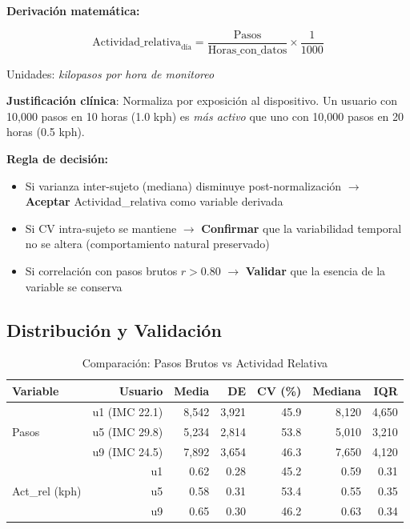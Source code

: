 \documentclass[12pt,letterpaper,twoside]{report}
\begin{document}
\begin{estadisticobox}
\textbf{Derivación matemática:}

\begin{equation}
\text{Actividad\_relativa}_{\text{día}} = \frac{\text{Pasos}}{\text{Horas\_con\_datos}} \times \frac{1}{1000}
\end{equation}

Unidades: \textit{kilopasos por hora de monitoreo}

\textbf{Justificación clínica}: Normaliza por exposición al dispositivo. Un usuario con 10,000 pasos en 10 horas (1.0 kph) es \textit{más activo} que uno con 10,000 pasos en 20 horas (0.5 kph).
\end{estadisticobox}

\begin{reglabox}
\textbf{Regla de decisión:}

\begin{itemize}[noitemsep]
    \item Si varianza inter-sujeto (mediana) disminuye post-normalización $\to$ \textbf{Aceptar} Actividad\_relativa como variable derivada
    \item Si CV intra-sujeto se mantiene $\to$ \textbf{Confirmar} que la variabilidad temporal no se altera (comportamiento natural preservado)
    \item Si correlación con pasos brutos $r > 0.80$ $\to$ \textbf{Validar} que la esencia de la variable se conserva
\end{itemize}
\end{reglabox}

\subsection{Distribución y Validación}

\begin{table}[H]
\centering
\caption{Comparación: Pasos Brutos vs Actividad Relativa}
\label{tab:activity_comparison}
\begin{tabular}{@{}lrrrrrr@{}}
\toprule
\textbf{Variable} & \textbf{Usuario} & \textbf{Media} & \textbf{DE} & \textbf{CV (\%)} & \textbf{Mediana} & \textbf{IQR} \\
\midrule
\multirow{3}{*}{Pasos} 
    & u1 (IMC 22.1) & 8,542 & 3,921 & 45.9 & 8,120 & 4,650 \\
    & u5 (IMC 29.8) & 5,234 & 2,814 & 53.8 & 5,010 & 3,210 \\
    & u9 (IMC 24.5) & 7,892 & 3,654 & 46.3 & 7,650 & 4,120 \\
\midrule
\multirow{3}{*}{Act\_rel (kph)} 
    & u1 & 0.62 & 0.28 & 45.2 & 0.59 & 0.31 \\
    & u5 & 0.58 & 0.31 & 53.4 & 0.55 & 0.35 \\
    & u9 & 0.65 & 0.30 & 46.2 & 0.63 & 0.34 \\
\bottomrule
\end{tabular}
\end{table}
\end{document}
